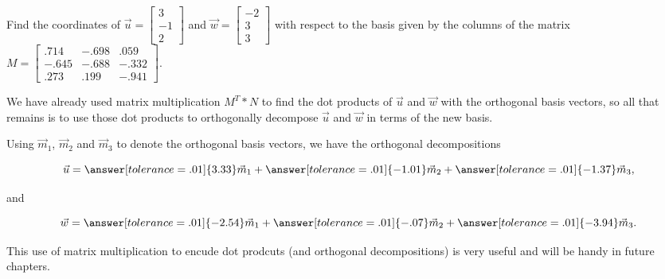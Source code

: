 \documentclass{ximera}
\begin{document}
  \begin{example}
   Find the coordinates of $\vec{u}=\begin{bmatrix}
   3\\-1\\2
   \end{bmatrix}$ and $\vec{w}=\begin{bmatrix}
      -2\\3\\3
   \end{bmatrix}$ with respect to the basis given by the columns of the matrix $M=\begin{bmatrix}
      .714 & -.698 &.059\\-.645&-.688&-.332\\.273&.199&-.941
   \end{bmatrix}$. 

   \begin{solution}
   
      We have already used matrix multiplication $M^T*N$ to find the dot products of $\vec{u}$ and $\vec{w}$ with the orthogonal basis vectors, so all that remains is to use those dot products to orthogonally decompose $\vec{u}$ and $\vec{w}$ in terms of the new basis. 

      Using $\vec{m}_1$, $\vec{m}_2$ and $\vec{m}_3$ to denote the orthogonal basis vectors, we have the orthogonal decompositions

      $$\vec{u}=\answer[tolerance=.01]{3.33}\vec{m}_1+\answer[tolerance=.01]{-1.01}\vec{m}_2+\answer[tolerance=.01]{-1.37}\vec{m}_3,$$

      and

      $$\vec{w}=\answer[tolerance=.01]{-2.54}\vec{m}_1+\answer[tolerance=.01]{-.07}\vec{m}_2+\answer[tolerance=.01]{-3.94}\vec{m}_3.$$

   \end{solution}
  \end{example}

  This use of matrix multiplication to encude dot prodcuts (and orthogonal decompositions) is very useful and will be handy in future chapters.


      
\end{document}
